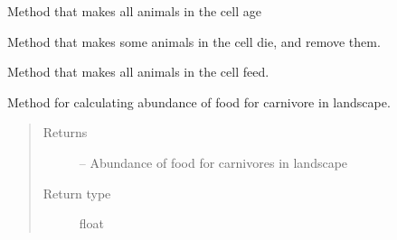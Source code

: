 \documentclass[a4paper,10pt,english]{sphinxmanual}
\begin{document}
\begin{fulllineitems}
\begin{fulllineitems}
\begin{quote}
\begin{description}
\begin{itemize}
\end{itemize}

\end{description}\end{quote}

\end{fulllineitems}


\begin{fulllineitems}
\label{\detokenize{landscape:biosim.landscape.Jungle.aging}}
Method that makes all animals in the cell age

\end{fulllineitems}


\begin{fulllineitems}
\label{\detokenize{landscape:biosim.landscape.Jungle.death}}
Method that makes some animals in the cell die, and remove them.

\end{fulllineitems}


\begin{fulllineitems}
\label{\detokenize{landscape:biosim.landscape.Jungle.feeding}}
Method that makes all animals in the cell feed.

\end{fulllineitems}


\begin{fulllineitems}
\label{\detokenize{landscape:biosim.landscape.Jungle.get_abundance_carnivore}}
Method for calculating abundance of food for carnivore in landscape.
\begin{quote}\begin{description}
\item[{Returns}] \leavevmode
{} -- Abundance of food for carnivores in landscape

\item[{Return type}] \leavevmode
float

\end{description}\end{quote}


\end{fulllineitems}
\end{fulllineitems}
\end{document}
